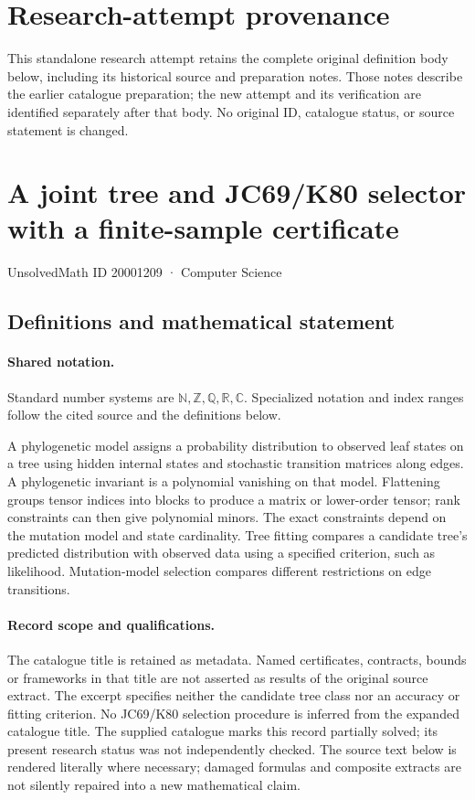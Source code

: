 \documentclass[11pt]{article}
\begin{document}
\section*{Research-attempt provenance}
This standalone research attempt retains the complete original definition body below,
including its historical source and preparation notes. Those notes describe the
earlier catalogue preparation; the new attempt and its verification are identified
separately after that body. No original ID, catalogue status, or source statement is changed.

\section{A joint tree and JC69/K80 selector with a finite-sample certificate}\label{20001209}
{\small UnsolvedMath ID 20001209 · Computer Science}
\subsection{Definitions and mathematical statement}

\paragraph{Shared notation.}Standard number systems are $\mathbb N,\mathbb Z,\mathbb Q,\mathbb R,\mathbb C$. Specialized notation and index ranges follow the cited source and the definitions below.


A phylogenetic model assigns a probability distribution to observed leaf states on a tree using hidden internal states and stochastic transition matrices along edges. A phylogenetic invariant is a polynomial vanishing on that model. Flattening groups tensor indices into blocks to produce a matrix or lower-order tensor; rank constraints can then give polynomial minors. The exact constraints depend on the mutation model and state cardinality. Tree fitting compares a candidate tree's predicted distribution with observed data using a specified criterion, such as likelihood. Mutation-model selection compares different restrictions on edge transitions.
\paragraph{Record scope and qualifications.}
The catalogue title is retained as metadata. Named certificates, contracts, bounds or frameworks in that title are not asserted as results of the original source extract.
The excerpt specifies neither the candidate tree class nor an accuracy or fitting criterion. No JC69/K80 selection procedure is inferred from the expanded catalogue title. The supplied catalogue marks this record partially solved; its present research status was not independently checked.
The source text below is rendered literally where necessary; damaged formulas and composite extracts are not silently repaired into a new mathematical claim.
\end{document}
